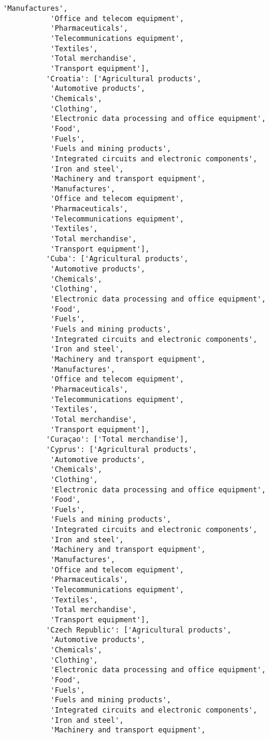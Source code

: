 \documentclass[11pt]{article}
\begin{document}
\begin{Verbatim}[commandchars=\\\{\}]
           'Manufactures',
           'Office and telecom equipment',
           'Pharmaceuticals',
           'Telecommunications equipment',
           'Textiles',
           'Total merchandise',
           'Transport equipment'],
          'Croatia': ['Agricultural products',
           'Automotive products',
           'Chemicals',
           'Clothing',
           'Electronic data processing and office equipment',
           'Food',
           'Fuels',
           'Fuels and mining products',
           'Integrated circuits and electronic components',
           'Iron and steel',
           'Machinery and transport equipment',
           'Manufactures',
           'Office and telecom equipment',
           'Pharmaceuticals',
           'Telecommunications equipment',
           'Textiles',
           'Total merchandise',
           'Transport equipment'],
          'Cuba': ['Agricultural products',
           'Automotive products',
           'Chemicals',
           'Clothing',
           'Electronic data processing and office equipment',
           'Food',
           'Fuels',
           'Fuels and mining products',
           'Integrated circuits and electronic components',
           'Iron and steel',
           'Machinery and transport equipment',
           'Manufactures',
           'Office and telecom equipment',
           'Pharmaceuticals',
           'Telecommunications equipment',
           'Textiles',
           'Total merchandise',
           'Transport equipment'],
          'Curaçao': ['Total merchandise'],
          'Cyprus': ['Agricultural products',
           'Automotive products',
           'Chemicals',
           'Clothing',
           'Electronic data processing and office equipment',
           'Food',
           'Fuels',
           'Fuels and mining products',
           'Integrated circuits and electronic components',
           'Iron and steel',
           'Machinery and transport equipment',
           'Manufactures',
           'Office and telecom equipment',
           'Pharmaceuticals',
           'Telecommunications equipment',
           'Textiles',
           'Total merchandise',
           'Transport equipment'],
          'Czech Republic': ['Agricultural products',
           'Automotive products',
           'Chemicals',
           'Clothing',
           'Electronic data processing and office equipment',
           'Food',
           'Fuels',
           'Fuels and mining products',
           'Integrated circuits and electronic components',
           'Iron and steel',
           'Machinery and transport equipment',

\end{Verbatim}
\end{document}
